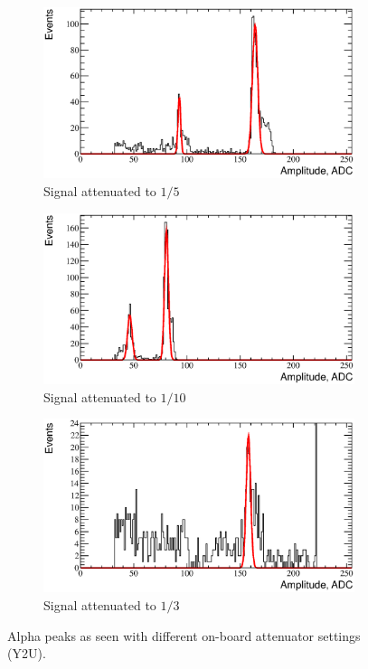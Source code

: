 \documentclass[a4paper,12pt]{article}
\begin{document}
\begin{figure}[htb]
\centering
\begin{subfigure}[t]{0.49\textwidth}
\includegraphics[width=\textwidth]{gfx/atten_1_over_5_ch06.eps}
\caption{Signal attenuated to $1/5$}
\label{fig:atten_distrib_nominal}
\end{subfigure}

\begin{subfigure}[t]{0.49\textwidth}
\includegraphics[width=\textwidth]{gfx/atten_1_over_10_ch06.eps}
\caption{Signal attenuated to $1/10$}
\end{subfigure}
%
\hfill
%
\begin{subfigure}[t]{0.49\textwidth}
\includegraphics[width=\textwidth]{gfx/atten_1_over_3_ch06.eps}
\caption{Signal attenuated to $1/3$}
\end{subfigure}
\caption{Alpha peaks as seen with different on-board attenuator settings (Y2U).}
\label{fig:atten_distrib}
\end{figure}
\end{document}
